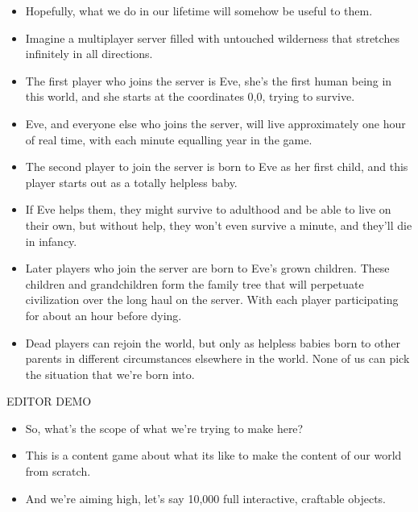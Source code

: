 \documentclass[12pt]{article}
\begin{document}
{\begin{itemize}
\item Hopefully, what we do in our lifetime will somehow be useful to them.

\item Imagine a multiplayer server filled with untouched wilderness that stretches infinitely in all directions.

\item The first player who joins the server is Eve, she's the  first human being in this world, and she starts at the coordinates 0,0, trying to survive.

\item Eve, and everyone else who joins the server, will live approximately one hour of real time, with each minute equalling year in the game.

\item The second player to join the server is born to Eve as her first child, and this player starts out as a totally helpless baby.

\item If Eve helps them, they might survive to adulthood and be able to live on their own, but without help, they won't even survive a minute, and they'll die in infancy.

\item Later players who join the server are born to Eve's grown children.  These children and grandchildren form the family tree that will perpetuate civilization over the long haul on the server.  With each player participating for about an hour before dying.

\item Dead players can rejoin the world, but only as helpless babies born to other parents in different circumstances elsewhere in the world.  None of us can pick the situation that we're born into.

\end{itemize}


EDITOR DEMO

\begin{itemize}

\item So, what's the scope of what we're trying to make here?

\item This is a content game about what its like to make the content of our world from scratch.

\item And we're aiming high, let's say 10,000 full interactive, craftable objects.


\end{itemize}}
\end{document}
